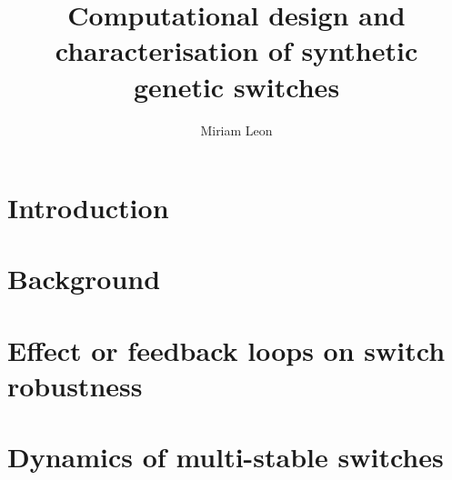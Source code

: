 \documentclass[]{phdthesis}
\title{Computational design and\\[0.2em]characterisation of synthetic\\[0.2em] genetic switches}
\author{Miriam Leon}
\begin{document}
\maketitle


\begin{abstract}
\end{abstract}

\tableofcontents*
\listoffigures
\listoftables
{}

\printglossary[type=\acronymtype, title=Abbreviations, toctitle=Abbreviations]


\begin{acknowledgements}
\end{acknowledgements}


\mainmatter*
\chapter{Introduction}


\mainmatter*
\chapter{Background}


\mainmatter*
\chapter{Effect or feedback loops on switch robustness }



\mainmatter*
 
\chapter{Dynamics of multi-stable switches}

%
%
%
%
%
\end{document}
